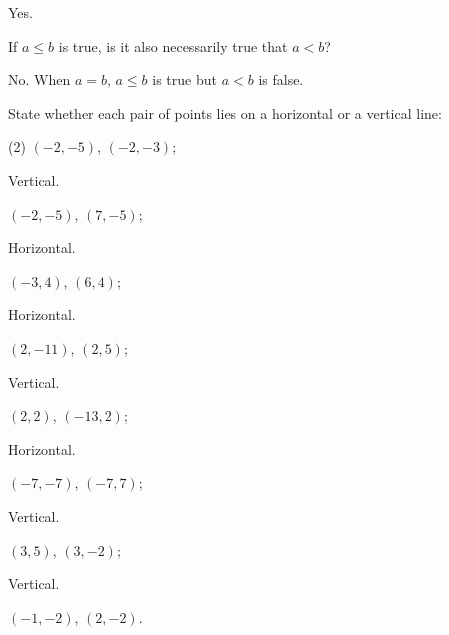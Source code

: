 \begin{questions}
\begin{tasks}
    \begin{solution}
      Yes.
    \end{solution}

    \task If $a \leq b$ is true, is it also necessarily true that $a<b$?

    \begin{solution}
      No. When $a=b$, $a \leq b$ is true but $a<b$ is false.
    \end{solution}

  \end{tasks}

  \item State whether each pair of points lies on a horizontal or a vertical line:
  \begin{tasks}(2)
    \task $(-2, -5)$, $(-2, -3)$;

    \begin{solution}
      Vertical.
    \end{solution}

    \task $(-2, -5)$, $(7, -5)$;

    \begin{solution}
      Horizontal.
    \end{solution}

    \task $(-3, 4)$, $(6, 4)$;

    \begin{solution}
      Horizontal.
    \end{solution}

    \task $(2, -11)$, $(2, 5)$;

    \begin{solution}
      Vertical.
    \end{solution}

    \task $(2, 2)$, $(-13, 2)$;

    \begin{solution}
      Horizontal.
    \end{solution}

    \task $(-7, -7)$, $(-7, 7)$;

    \begin{solution}
      Vertical.
    \end{solution}

    \task $(3, 5)$, $(3, -2)$;

    \begin{solution}
      Vertical.
    \end{solution}

    \task $(-1, -2)$, $(2, -2)$.


\end{tasks}
\end{questions}

